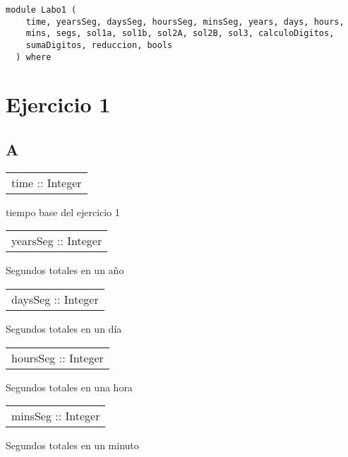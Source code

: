 \label{module:Labo1}
\haddockbeginheader
{\haddockverb\begin{verbatim}
module Labo1 (
    time, yearsSeg, daysSeg, hoursSeg, minsSeg, years, days, hours,
    mins, segs, sol1a, sol1b, sol2A, sol2B, sol3, calculoDigitos,
    sumaDigitos, reduccion, bools
  ) where\end{verbatim}}
\haddockendheader

\section{Ejercicio 1}
\subsection{A}
\begin{haddockdesc}
\item[\begin{tabular}{@{}l}
time :: Integer
\end{tabular}]
{\haddockbegindoc
tiempo base del ejercicio 1\par}
\end{haddockdesc}
\begin{haddockdesc}
\item[\begin{tabular}{@{}l}
yearsSeg :: Integer
\end{tabular}]
{\haddockbegindoc
Segundos totales en un año\par}
\end{haddockdesc}
\begin{haddockdesc}
\item[\begin{tabular}{@{}l}
daysSeg :: Integer
\end{tabular}]
{\haddockbegindoc
Segundos totales en un día\par}
\end{haddockdesc}
\begin{haddockdesc}
\item[\begin{tabular}{@{}l}
hoursSeg :: Integer
\end{tabular}]
{\haddockbegindoc
Segundos totales en una hora\par}
\end{haddockdesc}
\begin{haddockdesc}
\item[\begin{tabular}{@{}l}
minsSeg :: Integer
\end{tabular}]
{\haddockbegindoc
Segundos totales en un minuto\par}
\end{haddockdesc}
